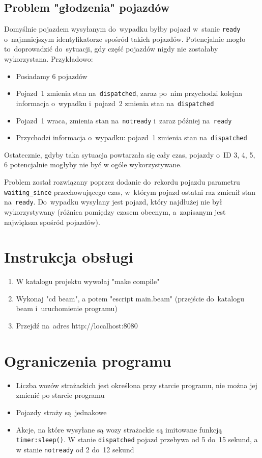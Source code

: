 \documentclass{article}
\begin{document}
\subsection{Problem "głodzenia" pojazdów}
Domyślnie pojazdem wysyłanym do~wypadku byłby pojazd w~stanie \texttt{ready} o~najmniejszym identyfikatorze spośród takich pojazdów. Potencjalnie mogło to~doprowadzić do~sytuacji, gdy część pojazdów nigdy nie zostałaby wykorzystana. Przykładowo:
\begin{itemize}
	\item Posiadamy 6 pojazdów
	\item Pojazd~1 zmienia stan na~\texttt{dispatched}, zaraz po~nim przychodzi kolejna informacja o~wypadku i~pojazd~2 zmienia stan na~\texttt{dispatched}
	\item Pojazd~1 wraca, zmienia stan na~\texttt{notready} i~zaraz później na~\texttt{ready}
	\item Przychodzi informacja o~wypadku: pojazd~1 zmienia stan na~\texttt{dispatched}
\end{itemize}
Ostatecznie, gdyby taka sytuacja powtarzała się cały czas, pojazdy o~ID 3, 4, 5, 6 potencjalnie mogłyby nie być w ogóle wykorzystywane.

Problem został rozwiązany poprzez dodanie do~rekordu pojazdu parametru \texttt{waiting\_since} przechowującego czas, w~którym pojazd ostatni raz zmienił stan na~\texttt{ready}. Do~wypadku wysyłany jest pojazd, który najdłużej nie był wykorzystywany (różnica pomiędzy czasem obecnym, a~zapisanym jest największa spośród pojazdów).

\section{Instrukcja obsługi}
\begin{enumerate}
	\item W katalogu projektu wywołaj "make compile"
	\item Wykonaj "cd beam", a potem "escript main.beam" (przejście do~katalogu beam i~uruchomienie programu)
	\item Przejdź na~adres \mbox{http://localhost:8080}
\end{enumerate}

\section{Ograniczenia programu}
\begin{itemize}
	\item Liczba wozów strażackich jest określona przy starcie programu, nie można jej zmienić po starcie programu
	\item Pojazdy straży są~jednakowe
	\item Akcje, na które wysyłane są wozy strażackie są imitowane funkcją \texttt{timer:sleep()}. W stanie \texttt{dispatched} pojazd przebywa od 5 do~15 sekund, a w stanie \texttt{notready} od 2 do~12 sekund
\end{itemize}
\end{document}
